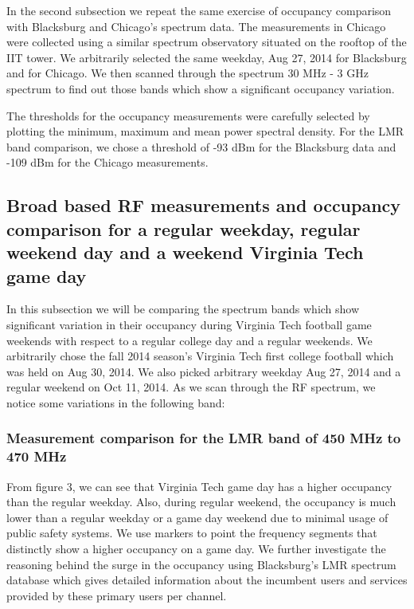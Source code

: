 \documentclass[12pt,sts]{report}
\begin{document}
In the second subsection we repeat the same exercise of occupancy comparison with Blacksburg and Chicago's spectrum data. The measurements in Chicago were collected using a similar spectrum observatory situated on the rooftop of the IIT tower.
We arbitrarily selected the same weekday, Aug 27, 2014 for Blacksburg and for Chicago. We then scanned through the spectrum 30 MHz - 3 GHz spectrum to find out those bands which show a significant occupancy variation.

The thresholds for the occupancy measurements were carefully selected by plotting the minimum, maximum and mean power spectral density. For the LMR band comparison, we chose a threshold of -93 dBm for the Blacksburg data and -109 dBm for the Chicago measurements.

	\subsection{Broad based RF measurements and occupancy comparison for a regular weekday, regular weekend day and a weekend Virginia Tech game day}
	
	In this subsection we will be comparing the spectrum bands which show significant variation in their occupancy during Virginia Tech football game weekends with respect to a regular college day and a regular weekends. We arbitrarily chose the fall 2014 season's Virginia Tech first college football which was held on Aug 30, 2014. We also picked arbitrary weekday Aug 27, 2014 and a regular weekend on Oct 11, 2014. As we scan through the RF spectrum, we notice some variations in the following band:
	
		\subsubsection{Measurement comparison for the LMR band of 450 MHz to 470 MHz}
		
		From figure 3, we can see that Virginia Tech game day has a higher occupancy than the regular weekday. Also, during regular weekend, the occupancy is much lower than a regular weekday or a game day weekend due to minimal usage of public safety systems. We use markers to point the frequency segments that distinctly show a higher occupancy on a game day. We further investigate the reasoning behind the surge in the occupancy using Blacksburg's LMR spectrum database \cite{blacksburg_spec_occ} which gives detailed information about the incumbent users and services provided by these primary users per channel.
		
\end{document}
